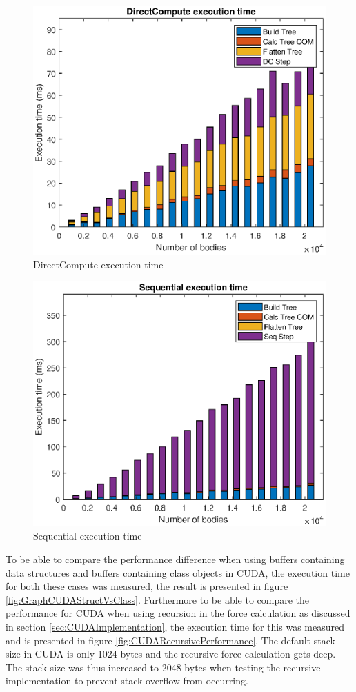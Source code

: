 \begin{figure}[H]
    \centering  
    \includegraphics[width=.8\textwidth]{Results/Figs/DirectComputeBarChart.eps}
    \caption{DirectCompute execution time}
    \label{fig:DirectComputeExecTime}
\end{figure}

\begin{figure}[H]
    \centering
    \includegraphics[width=.8\textwidth]{Results/Figs/SequentialBarChart.eps}
    \caption{Sequential execution time}
    \label{fig:SeqExecTime}
\end{figure}


To be able to compare the performance difference when using buffers containing data structures and buffers containing class objects in CUDA, the execution time for both these cases was measured, the result is presented in figure \ref{fig:GraphCUDAStructVsClass}. Furthermore to be able to compare the performance for CUDA when using recursion in the force calculation as discussed in section \ref{sec:CUDAImplementation}, the execution time for this was measured and is presented in figure \ref{fig:CUDARecursivePerformance}. The default stack size in CUDA is only 1024 bytes and the recursive force calculation gets deep. The stack size was thus increased to 2048 bytes when testing the recursive implementation to prevent stack overflow from occurring.

